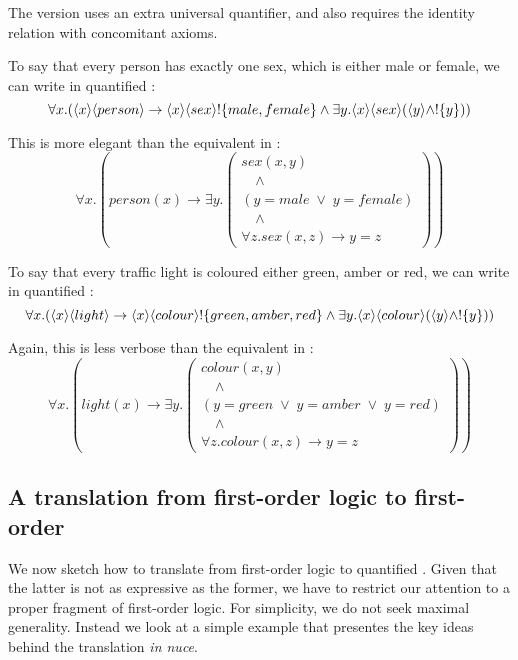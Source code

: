 \NI The \fol{} version uses an extra universal quantifier, and also
requires the identity relation with concomitant axioms.

To say that every person has exactly one sex, which is either male or
female, we can write in quantified \cathoristic{}:
\[
   \forall x . 
      ( \langle x \rangle \langle person \rangle \rightarrow \langle x \rangle \langle sex \rangle !\{male, female\} 
      \land 
      \exists y . \langle x \rangle \langle sex \rangle (\langle y \rangle \land
   ! \{y\}) )
\]

\NI This is more elegant than the equivalent in \fol{}:
\[
   \forall x. ( person(x) \rightarrow \exists y .
   \left(
      \begin{array}{l}
        sex(x,y) \\
        \quad\land\\
        (y = male \; \lor \; y = female)\\ 
        \quad\land\\
        \forall z . sex(x,z) \rightarrow    y = z 
      \end{array}
   \right))
\]

\NI To say that every traffic light is coloured either green, amber or
red, we can write in quantified \cathoristic{}:
\[
   \forall x. (\langle x \rangle \langle light \rangle \rightarrow \langle x \rangle \langle colour \rangle !\{green, amber, red\} \land \exists y . \langle x \rangle \langle colour \rangle (\langle y \rangle \land !\{y\}))
\]

\NI Again, this is less verbose than the equivalent in
\fol{}:
\[
   \forall x. ( light(x) \rightarrow \exists y .
   \left(
      \begin{array}{l}
        colour(x,y) \\
        \quad\land\\
        (y = green \; \lor \; y = amber \; \lor \; y = red) \\
        \quad\land \\
        \forall z . colour(x,z) \rightarrow y = z
      \end{array}
   \right)  )
\]

\subsection{A translation from first-order logic to first-order \cathoristic{}}\label{translationFOLtoFOEL}

We now sketch how to translate from first-order logic to quantified
\cathoristic{}. Given that the latter is not as expressive as the
former, we have to restrict our attention to a proper fragment of first-order
logic. For simplicity, we do not seek maximal generality. Instead we
look at a simple example that presentes the key ideas behind the
translation \emph{in nuce}.

